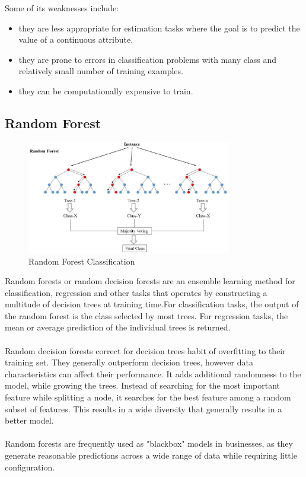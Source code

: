 Some of its weaknesses include:
\begin{itemize}
    \item they are less appropriate for estimation tasks where the goal is to predict the value of a continuous attribute.
    \item they are prone to errors in classification problems with many class and relatively small number of training examples.
    \item they can be computationally expensive to train.
\end{itemize}


\subsection*{Random Forest}
\begin{figure}[!ht]
	\centering
	\includegraphics[width=0.8\textwidth]{images/random-forest.jpg}
	\caption{Random Forest Classification}
	\centering
	\label{label:randomforest}
\end{figure}
Random forests or random decision forests are an ensemble learning method for classification, regression and other tasks that operates by constructing a multitude of decision trees at training time.For classification tasks, the output of the random forest is the class selected by most trees. For regression tasks, the mean or average prediction of the individual trees is returned.\\
\\
Random decision forests correct for decision trees habit of overfitting to their training set. They generally outperform decision trees, however data characteristics can affect their performance. It adds additional randomness to the model, while growing the trees. Instead of searching for the most important feature while splitting a node, it searches for the best feature among a random subset of features. This results in a wide diversity that generally results in a better model.\\
\\
Random forests are frequently used as "blackbox" models in businesses, as they generate reasonable predictions across a wide range of data while requiring little configuration.

